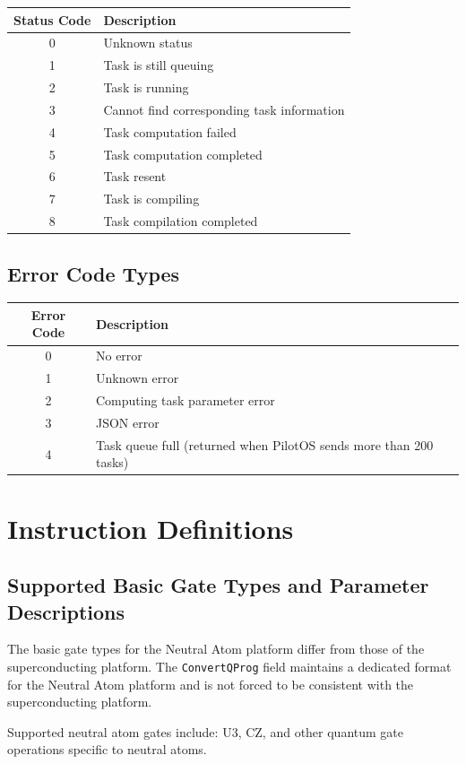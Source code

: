 \documentclass[12pt, a4paper]{article}
\begin{document}
\begin{longtable}{|c|p{12cm}|}
\hline
\textbf{Status Code} & \textbf{Description} \\ \hline
\endhead
0 & Unknown status \\ \hline
1 & Task is still queuing \\ \hline
2 & Task is running \\ \hline
3 & Cannot find corresponding task information \\ \hline
4 & Task computation failed \\ \hline
5 & Task computation completed \\ \hline
6 & Task resent \\ \hline
7 & Task is compiling \\ \hline
8 & Task compilation completed \\ \hline
\end{longtable}

\subsection{Error Code Types}

\begin{longtable}{|c|p{12cm}|}
\hline
\textbf{Error Code} & \textbf{Description} \\ \hline
\endhead
0 & No error \\ \hline
1 & Unknown error \\ \hline
2 & Computing task parameter error \\ \hline
3 & JSON error \\ \hline
4 & Task queue full (returned when PilotOS sends more than 200 tasks) \\ \hline
\end{longtable}

\section{Instruction Definitions}

\subsection{Supported Basic Gate Types and Parameter Descriptions}

The basic gate types for the Neutral Atom platform differ from those of the superconducting platform. The \texttt{ConvertQProg} field maintains a dedicated format for the Neutral Atom platform and is not forced to be consistent with the superconducting platform.

Supported neutral atom gates include: U3, CZ, and other quantum gate operations specific to neutral atoms.
\end{document}
